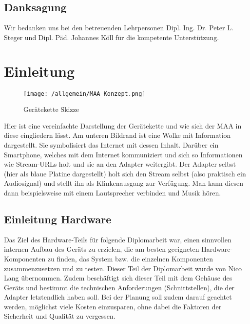 \documentclass[11pt, twoside]{article}
\begin{document}
\subsection*{Danksagung}
Wir bedanken uns bei den betreuenden Lehrpersonen Dipl. Ing. Dr. Peter L. Steger und Dipl. Päd. Johannes Köll für die kompetente Unterstützung.

\newpage
\tableofcontents %
\newpage

\pagestyle{fancy} %
\setcounter{page}{1} %

\section{Einleitung}
\begin{figure}[H]
	\centering
	\texttt{[image: /allgemein/MAA\_Konzept.png]}
	\caption{Gerätekette Skizze}
\end{figure}
Hier ist eine vereinfachte Darstellung der Gerätekette und wie sich der MAA in diese eingliedern lässt.\newline
Am unteren Bildrand ist eine Wolke mit Information dargestellt. Sie symbolisiert das Internet mit dessen Inhalt. Darüber ein Smartphone, welches mit dem Internet kommuniziert und sich so Informationen wie Stream-URLs holt und sie an den Adapter weitergibt. Der Adapter selbst (hier als blaue Platine dargestellt) holt sich den Stream selbst (also praktisch ein Audiosignal) und stellt ihn als Klinkenausgang zur Verfügung. Man kann diesen dann beispielsweise mit einem Lautsprecher verbinden und Musik hören.

\subsection{Einleitung Hardware}
Das Ziel des Hardware-Teils für folgende Diplomarbeit war, einen sinnvollen internen Aufbau des Geräts zu erzielen, die am besten geeigneten Hardware-Komponenten zu finden, das System bzw. die einzelnen Komponenten zusammenzusetzen und zu testen. Dieser Teil der Diplomarbeit wurde von Nico Lang übernommen.
Zudem beschäftigt sich dieser Teil mit dem Gehäuse des Geräts und bestimmt die technischen Anforderungen (Schnittstellen), die der Adapter letztendlich haben soll. 
Bei der Planung soll zudem darauf geachtet werden, möglichst viele Kosten einzusparen, ohne dabei die Faktoren der Sicherheit und Qualität zu vergessen.
\end{document}
